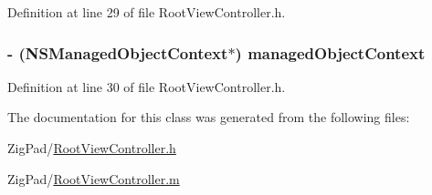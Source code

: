 Definition at line 29 of file RootViewController.h.

\hypertarget{interface_root_view_controller_adeebe5deeb50f760daa2b23db0a20d95}{
\subsubsection[{managedObjectContext}]{\setlength{\rightskip}{0pt plus 5cm}-\/ (NSManagedObjectContext$\ast$) managedObjectContext}}
\label{interface_root_view_controller_adeebe5deeb50f760daa2b23db0a20d95}


Definition at line 30 of file RootViewController.h.



The documentation for this class was generated from the following files:\begin{DoxyCompactItemize}
\item 
ZigPad/\hyperlink{_root_view_controller_8h}{RootViewController.h}\item 
ZigPad/\hyperlink{_root_view_controller_8m}{RootViewController.m}\end{DoxyCompactItemize}
